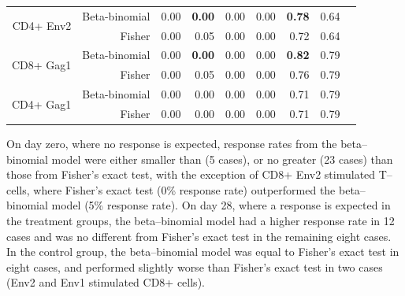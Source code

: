 \documentclass[11pt]{article}
\begin{document}
\begin{table}[ht]
\begin{center}
\begin{tabular}{rrrrrrrrr}
   \hline
\multirow{2}{*}{CD4+ Env2}& Beta-binomial & 0.00 & \textbf{0.00} & 0.00 &  0.00 & \textbf{0.78} & 0.64 \\ 
  & Fisher & 0.00 & 0.05 & 0.00 &  0.00 & 0.72 & 0.64 \\ 
   \hline
\multirow{2}{*}{CD8+ Gag1}& Beta-binomial & 0.00 & \textbf{0.00} & 0.00  & 0.00 & \textbf{0.82} & 0.79 \\ 
 & Fisher & 0.00 & 0.05 & 0.00  & 0.00 & 0.76 & 0.79 \\ 
   \hline
\multirow{2}{*}{CD4+ Gag1}& Beta-binomial & 0.00 & 0.00 & 0.00  & 0.00 & 0.71 & 0.79 \\ 
 & Fisher & 0.00 & 0.00 & 0.00  & 0.00 & 0.71 & 0.79 \\ 
   \hline


   
\end{tabular}
\end{center}
\end{table}

On day zero, where no response is expected, response rates from the beta--binomial model were either smaller than (5 cases), or no greater (23 cases) than those from Fisher's exact test, with the exception of CD8+ Env2 stimulated T--cells, where Fisher's exact test (0\% response rate) outperformed the beta--binomial model (5\% response rate). On day 28, where a response is expected in the treatment groups, the beta--binomial model had a higher response rate in 12 cases and was no different from Fisher's exact test in the remaining eight cases. In the control group, the beta--binomial model was equal to Fisher's exact test in eight cases, and performed slightly worse than Fisher's exact test in two cases (Env2 and Env1 stimulated CD8+ cells).  

\end{document}
